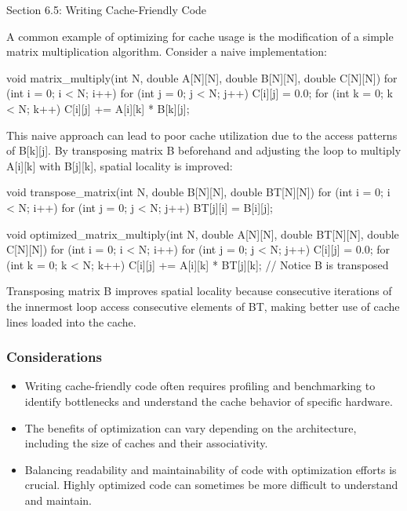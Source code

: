 \begin{notes}{Section 6.5: Writing Cache-Friendly Code}
\begin{highlight}
        A common example of optimizing for cache usage is the modification of a simple matrix multiplication algorithm. Consider a naive implementation:
    
    \begin{code}[C]
    void matrix_multiply(int N, double A[N][N], double B[N][N], double C[N][N]) {
        for (int i = 0; i < N; i++) {
            for (int j = 0; j < N; j++) {
                C[i][j] = 0.0;
                for (int k = 0; k < N; k++) {
                    C[i][j] += A[i][k] * B[k][j];
                }
            }
        }
    }
    \end{code}
    
        This naive approach can lead to poor cache utilization due to the access patterns of B[k][j]. By transposing matrix B beforehand and adjusting the loop to multiply A[i][k] with B[j][k], spatial 
        locality is improved:
    
    \begin{code}[C]
    void transpose_matrix(int N, double B[N][N], double BT[N][N]) {
        for (int i = 0; i < N; i++) {
            for (int j = 0; j < N; j++) {
                BT[j][i] = B[i][j];
            }
        }
    }
    
    void optimized_matrix_multiply(int N, double A[N][N], double BT[N][N], double C[N][N]) {
        for (int i = 0; i < N; i++) {
            for (int j = 0; j < N; j++) {
                C[i][j] = 0.0;
                for (int k = 0; k < N; k++) {
                    C[i][j] += A[i][k] * BT[j][k]; // Notice B is transposed
                }
            }
        }
    }
    \end{code}
        Transposing matrix B improves spatial locality because consecutive iterations of the innermost loop access consecutive elements of BT, making better use of cache lines loaded into the cache.
    \end{highlight}
    
    \subsubsection*{Considerations}
    
    \begin{itemize}
        \item Writing cache-friendly code often requires profiling and benchmarking to identify bottlenecks and understand the cache behavior of specific hardware.
        \item The benefits of optimization can vary depending on the architecture, including the size of caches and their associativity.
        \item Balancing readability and maintainability of code with optimization efforts is crucial. Highly optimized code can sometimes be more difficult to understand and maintain.
    \end{itemize}    
\end{notes}

